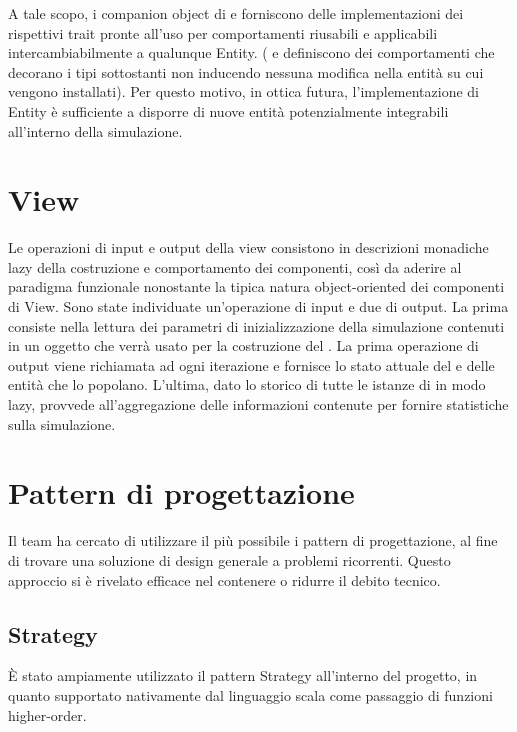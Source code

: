 A tale scopo, i companion object di  e  forniscono delle implementazioni dei rispettivi trait pronte all’uso per comportamenti riusabili e applicabili intercambiabilmente a qualunque Entity. ( e  definiscono dei comportamenti che decorano i tipi sottostanti non inducendo nessuna modifica nella entità su cui vengono installati). Per questo motivo, in ottica futura, l’implementazione di Entity è sufficiente a disporre di nuove entità potenzialmente integrabili all’interno della simulazione.

\section{View}

Le operazioni di input e output della view consistono in descrizioni monadiche lazy della costruzione e comportamento dei componenti, così da aderire al paradigma funzionale nonostante la tipica natura object-oriented dei componenti di View. Sono state individuate un'operazione di input e due di output. La prima consiste nella lettura dei parametri di inizializzazione della simulazione contenuti in un oggetto  che verrà usato per la costruzione del . La prima operazione di output viene richiamata ad ogni iterazione e fornisce lo stato attuale del  e delle entità che lo popolano. L'ultima, dato lo storico di tutte le istanze di  in modo lazy, provvede all'aggregazione delle informazioni contenute per fornire statistiche sulla simulazione.

\section{Pattern di progettazione}
Il team ha cercato di utilizzare il più possibile i pattern di progettazione, al fine di trovare una soluzione di design generale a problemi ricorrenti. Questo approccio si è rivelato efficace nel contenere o ridurre il debito tecnico.
\subsection{Strategy}
È stato ampiamente utilizzato il pattern Strategy all’interno del progetto, in quanto supportato nativamente dal linguaggio scala come passaggio di funzioni higher-order.
